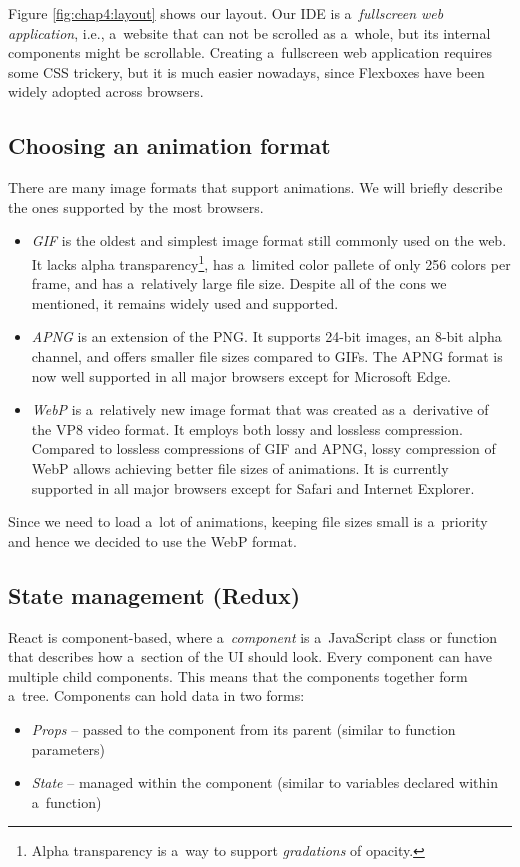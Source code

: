 Figure \ref{fig:chap4:layout} shows our layout. Our IDE is a~\emph{fullscreen web application}, i.e., a~website that can not be scrolled as a~whole, but
its internal components might be scrollable. Creating a~fullscreen web application requires some CSS trickery, but it is much easier nowadays, since Flexboxes
have been widely adopted across browsers.

\subsection{Choosing an animation format}
There are many image formats that support animations. We will briefly describe the ones supported by the most browsers.
\begin{itemize}
    \item \emph{GIF} is the oldest and simplest image format still commonly used on the web. It lacks alpha transparency\footnote{Alpha transparency is a~way to
    support \emph{gradations} of opacity.}, has a~limited color pallete of only 256 colors per frame, and has a~relatively large file size.
    Despite all of the cons we mentioned, it remains widely used and supported.

    \item \emph{APNG} is an extension of the PNG. It supports 24-bit images, an 8-bit alpha channel, and offers smaller file sizes compared to GIFs. The APNG format
    is now well supported in all major browsers except for Microsoft Edge.

    \item \emph{WebP} is a~relatively new image format that was created as a~derivative of the VP8 video format. It employs both lossy and lossless compression.
    Compared to lossless compressions of GIF and APNG, lossy compression of WebP allows achieving better file sizes of animations. It is currently supported
    in all major browsers except for Safari and Internet Explorer.
\end{itemize}

Since we need to load a~lot of animations, keeping file sizes small is a~priority and hence we decided to use the WebP format.

\subsection{State management (Redux)}
React is component-based, where a~\emph{component} is a~JavaScript class or function that describes how a~section of the UI should look. 
Every component can have multiple child components. This means that the components together form a~tree. Components can hold data in
two forms:
\begin{itemize}
    \item \emph{Props} -- passed to the component from its parent (similar to function parameters)
    \item \emph{State} -- managed within the component (similar to variables declared within a~function)
\end{itemize}

